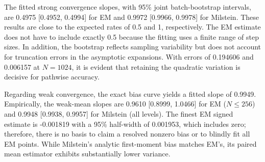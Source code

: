 The fitted strong convergence slopes, with 95\% joint batch-bootstrap intervals, are 0.4975 [0.4952, 0.4994] for EM and 0.9972 [0.9966, 0.9978] for Milstein. These results are close to the expected rates of 0.5 and 1, respectively. The EM estimate does not have to include exactly 0.5 because the fitting uses a finite range of step sizes. In addition, the bootstrap reflects sampling variability but does not account for truncation errors in the asymptotic expansions. With errors of 0.194606 and 0.006157 at $N=1024$, it is evident that retaining the quadratic variation is decisive for pathwise accuracy.

Regarding weak convergence, the exact bias curve yields a fitted slope of 0.9949. Empirically, the weak-mean slopes are 0.9610 [0.8999, 1.0466] for EM ($N\leq256$) and 0.9948 [0.9938, 0.9957] for Milstein (all levels). The finest EM signed estimate is -0.001819 with a 95\% half-width of 0.001953, which includes zero; therefore, there is no basis to claim a resolved nonzero bias or to blindly fit all EM points. While Milstein's analytic first-moment bias matches EM's, its paired mean estimator exhibits substantially lower variance.

